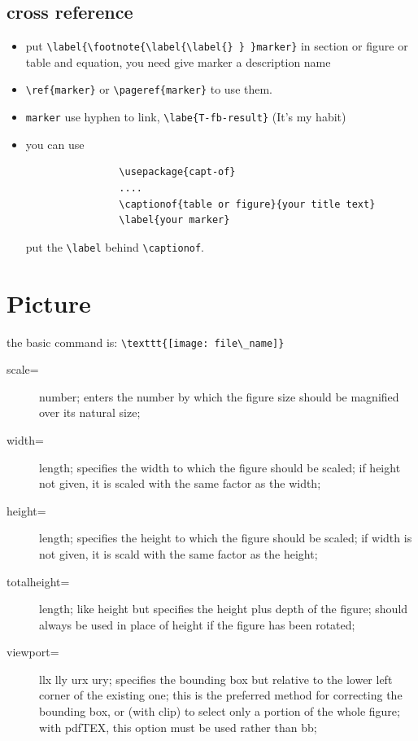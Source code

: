 \documentclass[a4paper,12pt,twoside]{book}
\begin{document}
\begin{CJK*}{UTF8}{song}
		\subsection{cross reference}
			\begin{itemize}
				\item put \verb=\label{\footnote{\label{\label{} } }marker}= in section or figure or table and equation, you need give marker a description name
				\item \verb=\ref{marker}= or \verb=\pageref{marker}= to use them.
				\item \verb=marker= use hyphen to link, \verb=\labe{T-fb-result}= (It's my habit)
				\item you can use
				\begin{verbatim}
				\usepackage{capt-of}
				....
				\captionof{table or figure}{your title text}
				\label{your marker}
				\end{verbatim}
				put the \verb=\label= behind \verb=\captionof=.
	
			\end{itemize}
	\section{Picture}
		the basic command is:
		\verb!\texttt{[image: file\_name]}!
		
		\begin{description}
		\item [scale=] number; enters the number by which the figure size should be magnified over its natural size;
		\item [width=] length; specifies the width to which the figure should be scaled; if height not given, it is scaled with the same factor as the width;
		\item [height=] length; specifies the height to which the figure should be scaled; if width is not given, it is scald with the same factor as the height;
		\item [totalheight=] length; like height but specifies the height plus depth of the figure; should always be used in place of height if the figure has been rotated;
		\item [viewport=] llx lly urx ury; specifies the bounding box but relative to the lower left corner of the existing one; this is the preferred method for correcting the bounding box, or (with clip) to select only a portion of the whole figure; with pdfTEX, this option must be used rather than bb;
		\end{description}


\end{CJK*}
\end{document}
